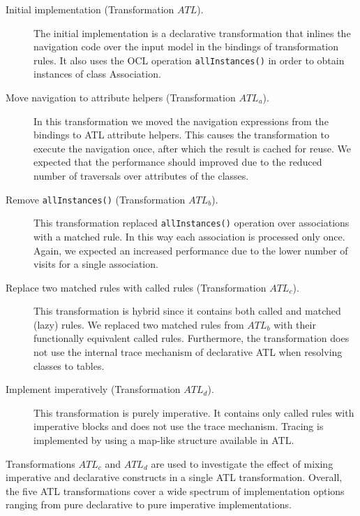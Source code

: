 \documentclass[12pt]{elsarticle}
\begin{document}
\begin{sloppypar}%
\begin{description}
\item[Initial implementation (Transformation $ATL$).] The initial implementation
is a declarative transformation that inlines the navigation code over the input
model in the bindings of transformation rules. It also uses the OCL operation
\texttt{allInstances()} in order to obtain instances of class Association.
\item[Move navigation to attribute helpers (Transformation $ATL_a$).] In this transformation we moved the navigation
expressions from the bindings to ATL attribute helpers. This causes the
transformation to execute the navigation once, after which the result is cached
for reuse. We expected that the performance should improved due to the reduced
number of traversals over attributes of the classes.
\item[Remove \texttt{allInstances()} (Transformation $ATL_b$).] This transformation
replaced \texttt{allInstances()} operation over associations with a matched rule. In this
way each association is processed only once. Again, we expected an increased
performance due to the lower number of visits for a single association.
\item[Replace two matched rules with called rules (Transformation
$ATL_c$).] This transformation is hybrid since it contains both called and
matched (lazy) rules. We replaced two matched rules from $ATL_b$ with their
functionally equivalent called rules. Furthermore, the transformation does not
use the internal trace mechanism of declarative ATL when resolving classes to
tables.
\item[Implement imperatively (Transformation
$ATL_d$).] This transformation is purely imperative. It contains only called
rules with imperative blocks and does not use the trace mechanism. Tracing is
implemented by using a map-like structure available in ATL.
\end{description}
\end{sloppypar}

Transformations $ATL_c$ and $ATL_d$ are used to investigate the effect of mixing
imperative and declarative constructs in a single ATL transformation. Overall,
the five ATL transformations cover a wide spectrum of implementation options
ranging from pure declarative to pure imperative implementations.
\end{document}
